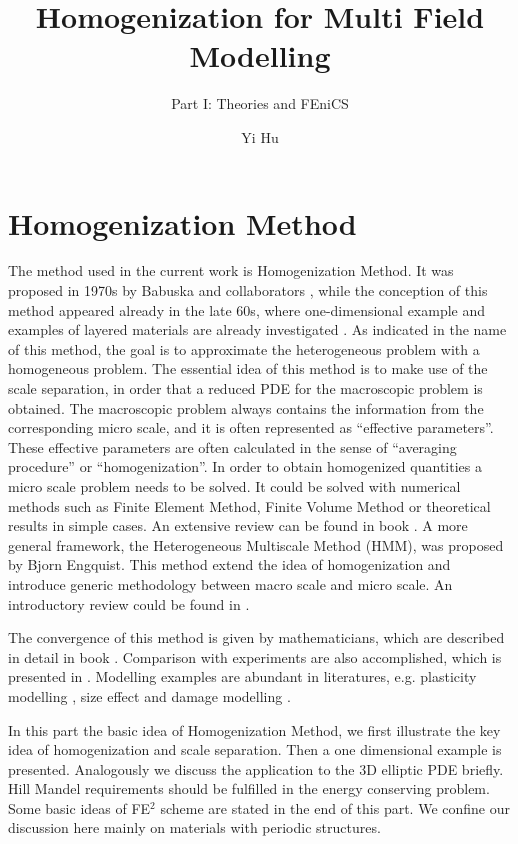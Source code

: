 \documentclass[10pt,a4paper]{scrreprt}
\author{Yi Hu}
\title{Homogenization for Multi Field Modelling}
\subtitle{Part I: Theories and FEniCS}
\begin{document}
\chapter{Homogenization Method}
The method used in the current work is Homogenization Method. It was proposed in 1970s by Babuska and collaborators \citep{EPFL-ARTICLE-184958}, while the conception of this method appeared already in the late 60s, where one-dimensional example and examples of layered materials are already investigated \citep{cioranescu_introduction_2000}. As indicated in the name of this method, the goal is to approximate the heterogeneous problem with a homogeneous problem. The essential idea of this method is to make use of the scale separation, in order that a reduced PDE for the macroscopic problem is obtained. The macroscopic problem always contains the information from the corresponding micro scale, and it is often represented as ``effective parameters''. These effective parameters are often calculated in the sense of ``averaging procedure'' or ``homogenization''. In order to obtain homogenized quantities a micro scale problem needs to be solved. It could be solved with numerical methods such as Finite Element Method, Finite Volume Method or theoretical results in simple cases. An extensive review  can be found in book \citep{efendiev2009multiscale}. A more general framework, the Heterogeneous Multiscale Method (HMM), was proposed by Bjorn Engquist. This method extend the idea of homogenization and introduce generic methodology between macro scale and micro scale. An introductory review could be found in \citep{weinan2007heterogeneous}.

The convergence of this method is given by mathematicians, which are described in detail in book \citep{cioranescu_introduction_2000}. Comparison with experiments are also accomplished, which is presented in \citep{jansson_materials_1990}. Modelling examples are abundant in literatures, e.g. plasticity modelling \citep{miehe_computational_1999}, size effect and damage modelling \citep{dascalu_damage_2008}.

In this part the basic idea of Homogenization Method, we first illustrate the key idea of homogenization and scale separation. Then a one dimensional example is presented. Analogously we discuss the application to the 3D elliptic PDE briefly. Hill Mandel requirements should be fulfilled in the energy conserving problem. Some basic ideas of FE$^{2}$ scheme are stated in the end of this part. We confine our discussion here mainly on materials with periodic structures. 
\end{document}
